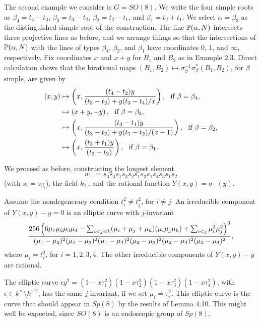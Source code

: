 \documentclass{amsart}
\begin{document}
 The second example we consider is $G=SO(8)$.  We write
the four simple roots as $\beta_4 = t_4-t_3$, $\beta_3 = t_3-t_2$,
$\beta_2 = t_2-t_1$, and $\beta_1 = t_2+t_1$.  We select
$\alpha=\beta_3$ as the distinguished
simple root of the construction.  The line
${\Bbb P}(\alpha,N)$ intersects three projective lines as before, and we
arrange things so that the intersections of ${\Bbb P}(\alpha,N)$ with the
lines of types $\beta_4$, $\beta_2$, and $\beta_1$ have coordinates
$0$, $1$, and $\infty$, respectively. Fix
coordinates
 $x$ and $x+y$ for $B_1$ and $B_2$ as in Example 2.3.
Direct calculation shows that the birational maps $(B_1,B_2)\mapsto
\sigma^{-1}_\beta\sigma^*_\beta(B_1,B_2)$, for $\beta$ simple, are
given by
\begin{align*}
(x,y) &\mapsto \left(x,{(t_4-t_2) y\over (t_3-t_2) + y (t_3-t_4)/x}
  \right),\ \hbox{ if } \beta=\beta_4,\\
      &\mapsto \left(x+y,-y\right),\ \hbox{ if } \beta=\beta_3,\\
      &\mapsto \left(x,{(t_3-t_1) y\over (t_3-t_2) + y (t_1-t_2)/(x-1)}
  \right),\ \hbox{ if } \beta=\beta_2,\\
      &\mapsto \left(x,{(t_3+t_1)y\over (t_3-t_2)}\right),\ \hbox{ if } 
    \beta=\beta_1.
\end{align*}
\endproclaim

We proceed as before, constructing the longest element 
$$w_- = s_3 s_4 s_1 s_3 s_2 s_1 s_3 s_1 s_4 s_3 s_1 s_2$$
(with $s_i = s_{\beta_i}$), the
field $k_1^-$, and the rational function $Y(x,y) = \sigma_{-} (y)$.

  Assume the nondegeneracy condition
$t_i^2\ne t_j^2$, for $i\ne j$.
An irreducible component of $Y(x,y)-y=0$ is an elliptic
curve with $j$-invariant
$${256 \left(6\mu_1\mu_2\mu_3\mu_4-\sum_{i<j<k} (\mu_i+\mu_j+\mu_k)(\mu_i \mu_j \mu_k)
        + \sum_{i<j} \mu_i^2\mu_j^2\right)^3\over
(\mu_1-\mu_2)^2 (\mu_1-\mu_3)^2 (\mu_1-\mu_4)^2 (\mu_2-\mu_3)^2
 (\mu_2-\mu_4)^2 (\mu_3-\mu_4)^2},$$
where $\mu_i = t_i^2$, for $i=1,2,3,4$.
The other irreducible components of $Y(x,y)-y$ are rational.
\endproclaim

The elliptic curve $\epsilon y^2 = (1- x \tau_1^2)(1-x \tau_2^2)(1-x \tau_3^2)
(1-x \tau_4^2)$, with $\epsilon \in k^\times\setminus k^{\times\,2}$,
 has the same $j$-invariant, if we set $\mu_i=\tau_i^2$.  
This elliptic curve
is the curve that should appear in
$Sp(8)$ by the results of Lemma 4.10.  This
might well be expected,
since $SO(8)$ is an endoscopic group of
$Sp(8)$.
\end{document}
